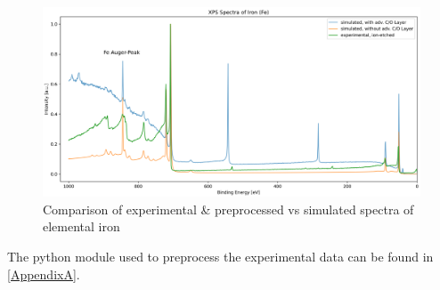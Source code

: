 \begin{figure}
    \centering
    \includegraphics[width=\textwidth]{Figures/Fe_XPS.png}
    \caption{Comparison of experimental \& preprocessed vs simulated spectra of elemental iron}
    \label{fig:ex_vs_sim}
\end{figure}

The python module used to preprocess the experimental data can be found in \ref{AppendixA}.